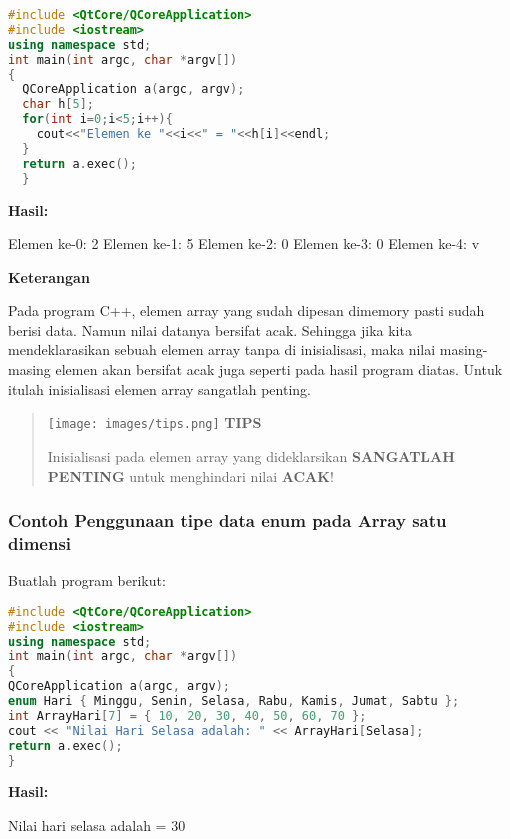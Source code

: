 \begin{lstlisting}[language=c++, caption=Tanpa inisialisasi array langsung ditampilkan, label=contoh3-6]
#include <QtCore/QCoreApplication>
#include <iostream>
using namespace std;
int main(int argc, char *argv[])
{
  QCoreApplication a(argc, argv);
  char h[5];
  for(int i=0;i<5;i++){
    cout<<"Elemen ke "<<i<<" = "<<h[i]<<endl;
  }
  return a.exec();
  }
\end{lstlisting}

\textbf{Hasil:}

\begin{lcverbatim}
Elemen ke-0: 2
Elemen ke-1: 5
Elemen ke-2: 0
Elemen ke-3: 0
Elemen ke-4: v
\end{lcverbatim}

\textbf{Keterangan}

Pada program C++, elemen array yang sudah dipesan dimemory pasti sudah
berisi data. Namun nilai datanya bersifat acak. Sehingga jika kita
mendeklarasikan sebuah elemen array tanpa di inisialisasi, maka nilai
masing-masing elemen akan bersifat acak juga seperti pada hasil program
diatas. Untuk itulah inisialisasi elemen array sangatlah penting.

\begin{quotation}
\texttt{[image: images/tips.png]}	 \textbf{TIPS}
	 
	 Inisialisasi pada elemen array yang dideklarsikan \textbf{SANGATLAH
	 	PENTING} untuk menghindari nilai \textbf{ACAK}!
\end{quotation}


\subsubsection*{Contoh  Penggunaan tipe data enum pada Array satu dimensi}

Buatlah program berikut:

\begin{lstlisting}[language=c++, caption=Penggunaan tipe data enum pada Array satu dimensi, label=contoh3-7]
#include <QtCore/QCoreApplication>
#include <iostream>
using namespace std;
int main(int argc, char *argv[])
{
QCoreApplication a(argc, argv);
enum Hari { Minggu, Senin, Selasa, Rabu, Kamis, Jumat, Sabtu };
int ArrayHari[7] = { 10, 20, 30, 40, 50, 60, 70 };
cout << "Nilai Hari Selasa adalah: " << ArrayHari[Selasa];
return a.exec();
}
\end{lstlisting}

\textbf{Hasil:}

\begin{lcverbatim}
Nilai hari selasa adalah = 30
\end{lcverbatim}

